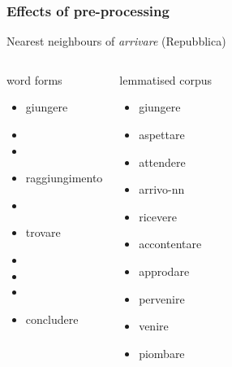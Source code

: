 \begin{frame}
  \frametitle{Effects of pre-processing}

  \centering
  Nearest neighbours of \emph{arrivare} (Repubblica)
  \footnotesize
  \begin{columns}[t]
    \column{4cm}
    \begin{block}{word forms}
      \begin{itemize}
      \item  giungere
      \item  {}
      \item  {}
      \item  raggiungimento
      \item  {}
      \item  trovare
      \item  {}
      \item  {}
      \item  {}
      \item  concludere
      \end{itemize}
    \end{block}
    \column{4cm}
    \begin{block}{lemmatised corpus}
      \begin{itemize}
      \item giungere
      \item aspettare
      \item attendere
      \item arrivo-nn
      \item ricevere
      \item accontentare
      \item approdare
      \item pervenire
      \item venire
      \item piombare
      \end{itemize}
    \end{block}
  \end{columns}
\end{frame}

